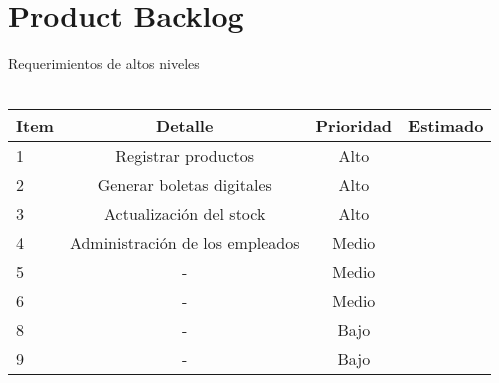 \chapter{Product Backlog}
Requerimientos de altos niveles
\\\\

\begin{tabular}{||l | c | c | r||}
	\hline
	\hline
	Item & Detalle & Prioridad & Estimado \\
	\hline
	1 & Registrar productos & Alto &  \\
	\hline
	2 & Generar boletas digitales & Alto &  \\
	\hline
	3 & Actualización del stock & Alto &  \\
	\hline
	4 & Administración de los empleados & Medio &  \\
	\hline
	5 & - & Medio &  \\
	\hline
	6 & - & Medio &  \\
	\hline
	8 & - & Bajo &  \\
	\hline
	9 & - & Bajo &  \\
	\hline
\end{tabular}
